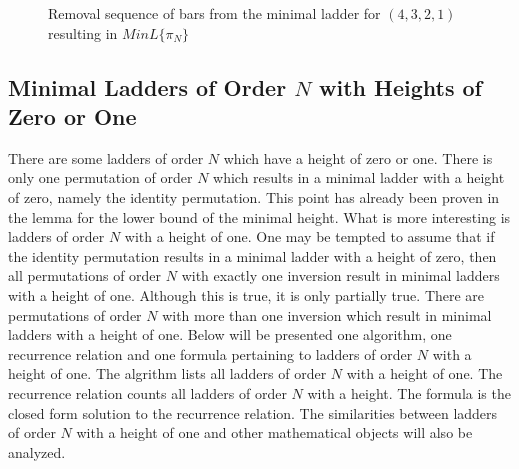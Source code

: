 \begin{center}
\begin{figure}[!htp]

         \caption{Removal sequence of bars from the minimal ladder for $(4,3,2,1)$ resulting in $MinL\{\pi_{N}\}$}
        \label{Fig:RemovalSequence}
        \end{figure}
       
   \end{center}


   \subsection{Minimal Ladders of Order $N$ with Heights of Zero or One}
   There are some ladders of order $N$ which have a height of zero or one.
   There is only one permutation of order $N$ which results in a minimal ladder with a height of zero, 
   namely the identity permutation. This point has already been proven in the lemma for the lower bound of the 
   minimal height. What is more interesting is ladders of order $N$ with a height of one. 
   One may be tempted to assume that if the identity permutation results in a minimal ladder 
   with a height of zero, then all permutations of order $N$ with exactly one inversion result in minimal ladders with a height of one.
   Although this is true, it is only partially true. There are permutations of order $N$ with more than one inversion 
   which result in minimal ladders with a height of one. Below will be presented one algorithm, one recurrence relation and one formula pertaining 
   to ladders of order $N$ with a height of one. The algrithm lists all ladders of order $N$ with a height of one. The recurrence relation
   counts all ladders of order $N$ with a height. The formula is the closed 
   form solution to the recurrence relation. The similarities between ladders of order $N$ with a height of one and other mathematical 
   objects will also be analyzed.\par 

